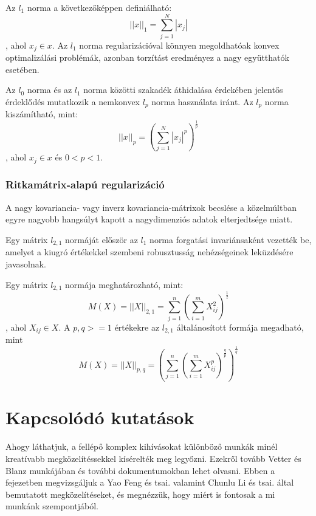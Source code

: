 \documentclass[12pt,a4]{article}
\begin{document}
        Az $l_{1}$ norma a következőképpen definiálható:
        \begin{equation}
            ||x||_{1} = \sum_{j=1}^{N}|x_{j}|
        \end{equation}
        , ahol $x_{j} \in x$. Az $l_{1}$ norma regularizációval könnyen megoldhatóak konvex optimalizálási problémák, azonban torzítást eredményez a nagy együtthatók esetében.

        Az $l_{0}$ norma és az $l_{1}$ norma közötti szakadék áthidalása érdekében jelentős érdeklődés mutatkozik a nemkonvex $l_{p}$ norma használata iránt. Az $l_{p}$ norma kiszámítható, mint:
        \begin{equation}
            || x ||_{p} = (\sum_{j = 1}^{N}|x_{j}|^{p})^{\frac{1}{p}}
        \end{equation}
        , ahol $x_{j} \in x$ és $0 < p < 1$. 

        
        \subsubsection{Ritkamátrix-alapú regularizáció}
        A nagy kovariancia- vagy inverz kovariancia-mátrixok becslése a közelmúltban egyre nagyobb hangsúlyt kapott a nagydimenziós adatok elterjedtsége miatt.

        Egy mátrix $l_{2,1}$ normáját először az $l_{1}$ norma forgatási invariánsaként vezették be, amelyet a kiugró értékekkel szembeni robusztusság nehézségeinek leküzdésére javasolnak.

        Egy mátrix $l_{2,1}$ normája meghatározható, mint:
        \begin{equation}
            M(X) = ||X||_{2,1} = \sum_{j=1}^{n}(\sum_{i=1}^{m}X_{ij}^{2})^{\frac{1}{2}}
        \end{equation}
        , ahol $X_{ij} \in X$. A $p,q>=1$ értékekre az $l_{2,1}$ általánosított formája megadható, mint
        \begin{equation}
            M(X) = ||X||_{p,q} = (\sum_{j=1}^{n}(\sum_{i=1}^{m}X_{ij}^{p})^{\frac{q}{p}})^{\frac{1}{q}}
        \end{equation}
    
    
    \section{Kapcsolódó kutatások}

        Ahogy láthatjuk, a fellépő komplex kihívásokat különböző munkák minél kreatívabb megközelítéssekkel kísérelték meg legyőzni. Ezekről tovább Vetter és Blanz \cite{blanzvetter} munkájában és további dokumentumokban lehet olvasni. Ebben a fejezetben megvizsgáljuk a Yao Feng és tsai. \cite{deca} valamint Chunlu Li és tsai. \cite{focus} által bemutatott megközelítéseket, és megnézzük, hogy miért is fontosak a mi munkánk szempontjából.
\end{document}

